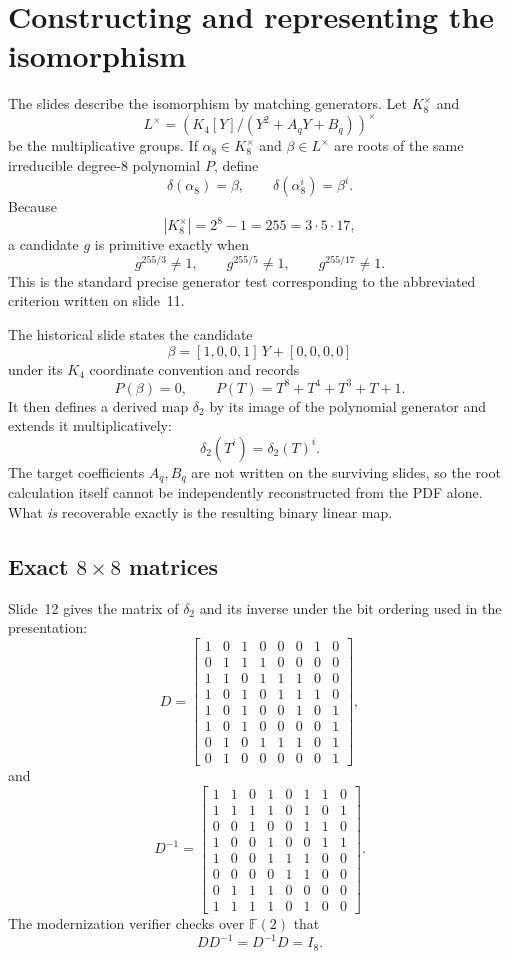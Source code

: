 \documentclass[11pt]{article}
\newcommand{\GF}{\mathbb{F}}
\begin{document}
\section{Constructing and representing the isomorphism}

The slides describe the isomorphism by matching generators.  Let
$K_8^\times$ and
\[
  L^\times
  =
  \left(K_4[Y]/(Y^2+A_qY+B_q)\right)^\times
\]
be the multiplicative groups.  If $\alpha_8\in K_8^\times$ and
$\beta\in L^\times$ are roots of the same irreducible degree-8 polynomial
$P$, define
\[
  \delta(\alpha_8)=\beta,
  \qquad
  \delta(\alpha_8^i)=\beta^i.
\]
Because
\[
  |K_8^\times|=2^8-1=255=3\cdot 5\cdot 17,
\]
a candidate $g$ is primitive exactly when
\[
  g^{255/3}\neq 1,\qquad
  g^{255/5}\neq 1,\qquad
  g^{255/17}\neq 1.
\]
This is the standard precise generator test corresponding to the abbreviated
criterion written on slide~11.

The historical slide states the candidate
\[
  \beta=[1,0,0,1]\,Y+[0,0,0,0]
\]
under its $K_4$ coordinate convention and records
\[
  P(\beta)=0,
  \qquad
  P(T)=T^8+T^4+T^3+T+1.
\]
It then defines a derived map $\delta_2$ by its image of the polynomial
generator and extends it multiplicatively:
\[
  \delta_2(T^i)=\delta_2(T)^i.
\]
The target coefficients $A_q,B_q$ are not written on the surviving slides,
so the root calculation itself cannot be independently reconstructed from the
PDF alone.  What \emph{is} recoverable exactly is the resulting binary
linear map.

\subsection{Exact \texorpdfstring{$8\times 8$}{8x8} matrices}

Slide~12 gives the matrix of $\delta_2$ and its inverse under the bit ordering
used in the presentation:
\[
D=
\left[
\begin{array}{cccccccc}
1&0&1&0&0&0&1&0\\
0&1&1&1&0&0&0&0\\
1&1&0&1&1&1&0&0\\
1&0&1&0&1&1&1&0\\
1&0&1&0&0&1&0&1\\
1&0&1&0&0&0&0&1\\
0&1&0&1&1&1&0&1\\
0&1&0&0&0&0&0&1
\end{array}
\right],
\]
and
\[
D^{-1}=
\left[
\begin{array}{cccccccc}
1&1&0&1&0&1&1&0\\
1&1&1&1&0&1&0&1\\
0&0&1&0&0&1&1&0\\
1&0&0&1&0&0&1&1\\
1&0&0&1&1&1&0&0\\
0&0&0&0&1&1&0&0\\
0&1&1&1&0&0&0&0\\
1&1&1&1&0&1&0&0
\end{array}
\right].
\]
The modernization verifier checks over $\GF(2)$ that
\[
  DD^{-1}=D^{-1}D=I_8.
\]
\end{document}
